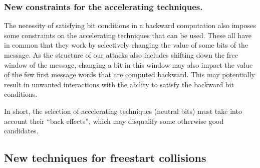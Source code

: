 \subsubsection{New constraints for the accelerating techniques.}
The necessity of satisfying bit conditions in a backward computation also imposes some constraints on the accelerating techniques that can be used. These all have in common that they work by
selectively changing the value of some bits of the message. As the structure of our attacks also includes shifting down the free window of the message, changing a bit in this window may also impact
the value of the few first message words that are computed backward. This may potentially result in unwanted interactions with the ability to satisfy the backward bit conditions.

In short, the selection of accelerating techniques (\eg neutral bits) must take into account their ``back effects'', which may disqualify some otherwise good candidates.

\subsection{New techniques for freestart collisions}
\label{sec:attack_techs}

